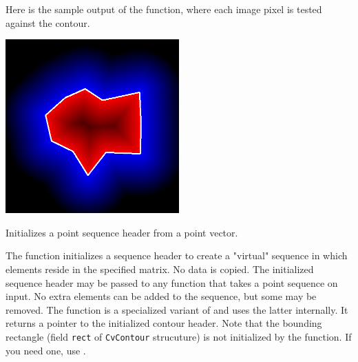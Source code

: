 Here is the sample output of the function, where each image pixel is tested against the contour.

\includegraphics[width=0.5\textwidth]{pics/pointpolygon.png}

\ifC

Initializes a point sequence header from a point vector.


\begin{description}
\end{description}

The function initializes a sequence
header to create a "virtual" sequence in which elements reside in
the specified matrix. No data is copied. The initialized sequence
header may be passed to any function that takes a point sequence
on input. No extra elements can be added to the sequence,
but some may be removed. The function is a specialized variant of
 and uses
the latter internally. It returns a pointer to the initialized contour
header. Note that the bounding rectangle (field \texttt{rect} of
\texttt{CvContour} strucuture) is not initialized by the function. If
you need one, use .

